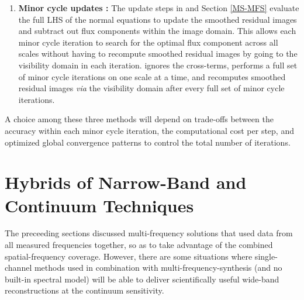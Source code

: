 \documentclass[structabstract]{stylefiles/aa}
\begin{document}
\begin{enumerate}
\item{\bf Minor cycle updates :}
The update steps in \citet{MSCLEAN} and Section \ref{MS-MFS}
evaluate the full LHS of the normal equations
to update the smoothed residual images and subtract out flux components 
within the image domain.
This allows each minor cycle iteration to search for the 
optimal flux component across all scales  
without having to recompute smoothed residual images by going to the visibility domain
in each iteration.
\citet{ERIC_MSCLEAN} ignores the cross-terms, performs
a full set of minor cycle iterations on one scale at a time, and recomputes
smoothed residual images {\it via} the visibility domain after every full set of
minor cycle iterations.
\end{enumerate}

\noindent A choice among these three methods
will depend on trade-offs between the accuracy within each minor cycle iteration, 
the computational cost per step, and optimized global convergence
patterns to control the total number of iterations.


\section{Hybrids of Narrow-Band and Continuum Techniques}

The preceeding sections discussed multi-frequency solutions that used data from all measured
frequencies together, so as to take advantage of the combined spatial-frequency coverage.
However, there are some situations where single-channel methods used in combination
with multi-frequency-synthesis (and no built-in spectral model) will be able to deliver
scientifically useful wide-band reconstructions at the continuum sensitivity.



%
\end{document}
